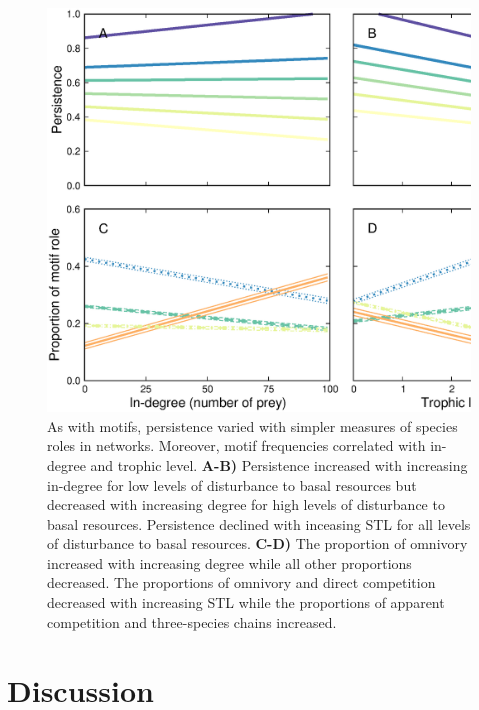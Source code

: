 \documentclass[12pt]{article}
\begin{document}
\begin{spacing}{2.0}
            \begin{figure}[h!]
                \centering
                \includegraphics[width=.75\textwidth]{figures/roles_vs_TL.eps}
                \caption{As with motifs, persistence varied with simpler measures of species roles in networks. Moreover, motif frequencies correlated with in-degree and trophic level. \textbf{A-B)} Persistence increased with increasing in-degree for low levels of disturbance to basal resources but decreased with increasing degree for high levels of disturbance to basal resources.
                Persistence declined with inceasing STL for all levels of disturbance to basal resources.
                \textbf{C-D)} The proportion of omnivory increased with increasing degree while all other proportions decreased. The proportions of omnivory and direct competition decreased with increasing STL while the proportions of apparent competition and three-species chains increased.}
                \label{fig:motifs_vs_TL_and_deg}
            \end{figure}        
        


\clearpage



\section*{Discussion}



\end{spacing}
\end{document}
